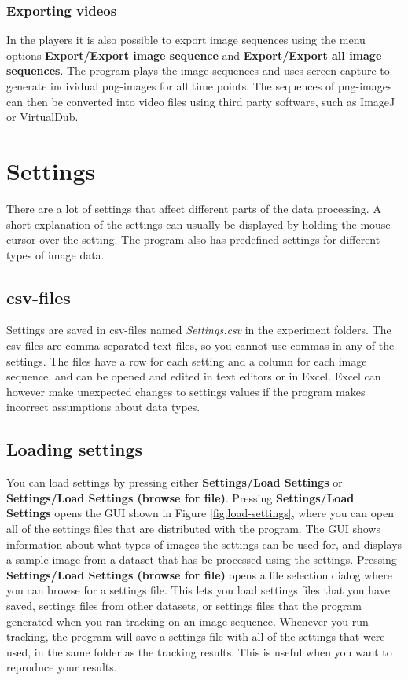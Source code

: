 \documentclass[a4paper, oneside, onecolumn, 11pt]{article}
\newcommand{\menu}[1]{\textbf{#1}}
\newcommand{\file}[1]{\emph{#1}}
\begin{document}
\subsubsection{Exporting videos}
\label{sec:export-video}
In the players it is also possible to export image sequences using the menu options \menu{Export/\allowbreak Export image sequence} and \menu{Export/\allowbreak Export\allowbreak{} all\allowbreak{} image\allowbreak{} sequences}. The program plays the image sequences and uses screen capture to generate individual png-images for all time points. The sequences of png-images can then be converted into video files using third party software, such as ImageJ or VirtualDub.

\section{Settings}
There are a lot of settings that affect different parts of the data processing. A short explanation of the settings can usually be displayed by holding the mouse cursor over the setting. The program also has predefined settings for different types of image data.

\subsection{csv-files}
Settings are saved in csv-files named \file{Settings.csv} in the experiment folders. The csv-files are comma separated text files, so you cannot use commas in any of the settings. The files have a row for each setting and a column for each image sequence, and can be opened and edited in text editors or in Excel. Excel can however make unexpected changes to settings values if the program makes incorrect assumptions about data types.

\subsection{Loading settings}
\label{sec:loading-settings}
You can load settings by pressing either \menu{Settings/\allowbreak Load Settings} or \menu{Settings/\allowbreak Load Settings (browse for file)}. Pressing \menu{Settings/\allowbreak Load Settings} opens the GUI shown in Figure \ref{fig:load-settings}, where you can open all of the settings files that are distributed with the program. The GUI shows information about what types of images the settings can be used for, and displays a sample image from a dataset that has be processed using the settings. Pressing \menu{Settings/\allowbreak Load Settings (browse for file)} opens a file selection dialog where you can browse for a settings file. This lets you load settings files that you have saved, settings files from other datasets, or settings files that the program generated when you ran tracking on an image sequence. Whenever you run tracking, the program will save a settings file with all of the settings that were used, in the same folder as the tracking results. This is useful when you want to reproduce your results.
\end{document}
